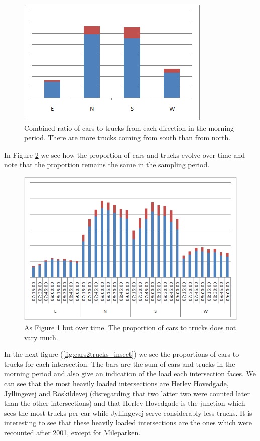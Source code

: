 \begin{figure}[htbp]
\centering
\includegraphics[scale=0.55]{cars_vs_truck_vs_direction.png}
\caption{Combined ratio of cars to trucks from each direction in the morning period. There are more trucks coming from south than from north.}
\label{fig:cars2trucks}
\end{figure}

In Figure \ref{fig:cars2trucks_time} we see how the proportion of cars and trucks evolve over time and note that the proportion remains the same in the sampling period.

\begin{figure}[htbp]
\centering
\includegraphics[scale=0.55]{cars_vs_trucks_vs_time_morning.png}
\caption{As Figure \ref{fig:cars2trucks} but over time. The proportion of cars to trucks does not vary much.}
\label{fig:cars2trucks_time}
\end{figure}

In the next figure (\ref{fig:cars2trucks_insect}) we see the proportions of cars to trucks for each intersection. The bars are the sum of cars and trucks in the morning period and also give an indication of the load each intersection faces. We can see that the most heavily loaded intersections are Herlev Hovedgade, Jyllingevej and Roskildevej (disregarding that two latter two were counted later than the other intersections) and that Herlev Hovedgade is the junction which sees the most trucks per car while Jyllingevej serve considerably less trucks. It is interesting to see that these heavily loaded intersections are the ones which were recounted after 2001, except for Mileparken.

